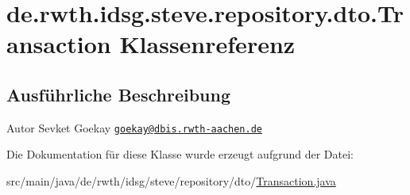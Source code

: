 \hypertarget{classde_1_1rwth_1_1idsg_1_1steve_1_1repository_1_1dto_1_1_transaction}{\section{de.\-rwth.\-idsg.\-steve.\-repository.\-dto.\-Transaction Klassenreferenz}
\label{classde_1_1rwth_1_1idsg_1_1steve_1_1repository_1_1dto_1_1_transaction}
}


\subsection{Ausführliche Beschreibung}
\begin{DoxyAuthor}{Autor}
Sevket Goekay \href{mailto:goekay@dbis.rwth-aachen.de}{\tt goekay@dbis.\-rwth-\/aachen.\-de} 
\end{DoxyAuthor}


Die Dokumentation für diese Klasse wurde erzeugt aufgrund der Datei\-:\begin{DoxyCompactItemize}
\item 
src/main/java/de/rwth/idsg/steve/repository/dto/\hyperlink{_transaction_8java}{Transaction.\-java}\end{DoxyCompactItemize}
